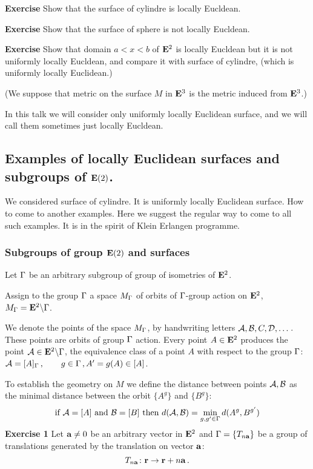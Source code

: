 \documentclass[12pt]{article}
\theoremstyle{definition}
\numberwithin{equation}{section}
\begin{document}
\medskip

{\bf Exercise}  Show that the surface of 
cylindre
is locally Eucldean.

\smallskip

{\bf Exercise}  Show that the surface of sphere
is not locally Eucldean.

\smallskip

{\bf Exercise}  Show that domain $a<x<b$ of ${\bf E}^2$
is locally Eucldean but it is not uniformly 
locally Eucldean, and compare it with surface
of cylindre, (which is uniformly locally 
Euclidean.)

(We suppose that metric on the surface
$M$ in ${\bf E}^3$
is  the metric induced from ${\bf E}^3$.)

In this talk we will consider only uniformly locally 
Euclidean surface, and we will call 
them sometimes just
locally Eucldean.



  \subsection
{Examples of locally Euclidean surfaces and 
subgroups of ${\bf E}(2)$.}

We considered surface of cylindre. It is
uniformly locally Euclidean surface.
  How to come to another examples.
Here we suggest the regular way to come
to all such examples. It is in the spirit of
Klein Erlangen programme.



\subsubsection
{Subgroups of group ${\bf E}(2)$ and surfaces}

 
  Let ${\Gamma}$ be an arbitrary subgroup
of group of isometries of ${\bf E}^2$.


Assign to the group ${\Gamma}$ a
space $M_{\Gamma}$ of orbits of ${\Gamma}$-group action
on ${\bf E}^2$,
$M_{\Gamma}={\bf E}^2\backslash {\Gamma}$.

 We denote the points of the space $M_{\Gamma}$, 
by handwriting letters ${\cal A},{\cal B},C,{\cal D},\dots$. These
points are orbits of group ${\Gamma}$ action.
Every  point $A\in {\bf E}^2$ produces the point
${\cal A}\in {\bf E}^2\backslash {\Gamma}$, the equivalence class
of a point $A$ with respect to the group ${\Gamma}$:
         $
{\cal A}=[A]_{\Gamma}\,,\qquad  g\in {\Gamma}\,,
A'=g(A)\in [A] 
        $.

  To establish the geometry on $M$
we define the distance between points ${\cal A},{\cal B}$
as the minimal distance between the orbit
   $\{A^g\}$ and $\{B^g\}$:
            $$
\hbox{if ${\cal A}=[A]$ and ${\cal B}=[B]$ then}\,\,
d({\cal A},{\cal B})=\min_{g,g'\in{\Gamma}}d(A^g,B^{g'})
            $$ 
{\bf Exercise 1}  Let ${\bf a}\not=0$ be an arbitrary vector
in ${\bf E}^2$ and ${\Gamma}=\{T_{n{\bf a}}\}$ be a group of translations
generated by the translation on vector ${\bf a}$:
                 $$
T_{n{\bf a}}\colon {\bf r}\to {\bf r}+n{\bf a}\,.
                 $$
\end{document}
